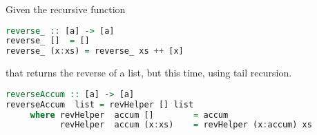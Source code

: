 \documentclass{article}
\begin{document}
\begin{Exercise}
	
Given the  recursive function 
\begin{lstlisting}[language=Haskell]
reverse_ :: [a] -> [a]
reverse_ []  = []
reverse_ (x:xs) = reverse_ xs ++ [x]	
\end{lstlisting}
that returns the reverse of a list, but this time, using tail recursion.
\end{Exercise}
\begin{Answer}
\begin{lstlisting}[language=Haskell]
reverseAccum :: [a] -> [a]
reverseAccum  list = revHelper [] list
     where revHelper  accum []        = accum
           revHelper  accum (x:xs)    = revHelper (x:accum) xs
\end{lstlisting}
\end{Answer}

\end{document}
